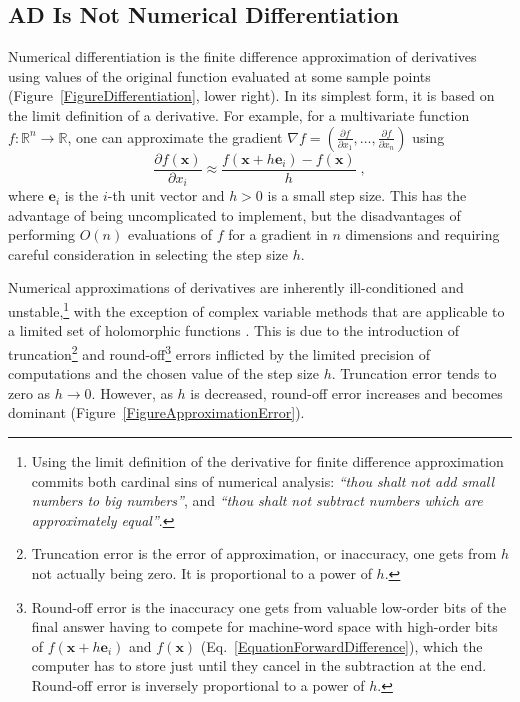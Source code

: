 \documentclass[twoside,11pt]{article}
\begin{document}
\subsection{AD Is Not Numerical Differentiation}

Numerical differentiation is the finite difference approximation of derivatives using values of the original function evaluated at some sample points \citep{Burden2001} (Figure~\ref{FigureDifferentiation}, lower right). In its simplest form, it is based on the limit definition of a derivative. For example, for a multivariate function $f:\mathbb{R}^n \to \mathbb{R}$, one can approximate the gradient $\nabla f=\left(\frac{\partial f}{\partial x_1},\dots,\frac{\partial f}{\partial x_n}\right)$ using
\begin{equation}
  \label{EquationForwardDifference}
  \frac{\partial f(\mathbf{x})}{\partial x_i} \approx \frac{f(\mathbf{x} + h \mathbf{e}_i) - f(\mathbf{x})}{h}\;,
\end{equation}
where $\mathbf{e}_i$ is the $i$-th unit vector and $h > 0$ is a small step size. This has the advantage of being uncomplicated to implement, but the disadvantages of performing $O(n)$ evaluations of $f$ for a gradient in $n$ dimensions and requiring careful consideration in selecting the step size $h$.

Numerical approximations of derivatives are inherently ill-conditioned and unstable,\footnote{Using the limit definition of the derivative for finite difference approximation commits both cardinal sins of numerical analysis: \emph{``thou shalt not add small numbers to big numbers''}, and \emph{``thou shalt not subtract numbers which are approximately equal''}.} with the exception of complex variable methods that are applicable to a limited set of holomorphic functions \citep{Fornberg1981}. This is due to the introduction of truncation\footnote{Truncation error is the error of approximation, or inaccuracy, one gets from $h$ not actually being zero. It is proportional to a power of $h$.} and round-off\footnote{Round-off error is the inaccuracy one gets from valuable low-order bits of the final answer having to compete for machine-word space with high-order bits of $f(\mathbf{x} + h \mathbf{e}_i)$ and $f(\mathbf{x})$ (Eq.~\ref{EquationForwardDifference}), which the computer has to store just until they cancel in the subtraction at the end. Round-off error is inversely proportional to a power of $h$.} errors inflicted by the limited precision of computations and the chosen value of the step size $h$. Truncation error tends to zero as $h \to 0$. However, as $h$ is decreased, round-off error increases and becomes dominant (Figure~\ref{FigureApproximationError}).
\end{document}
